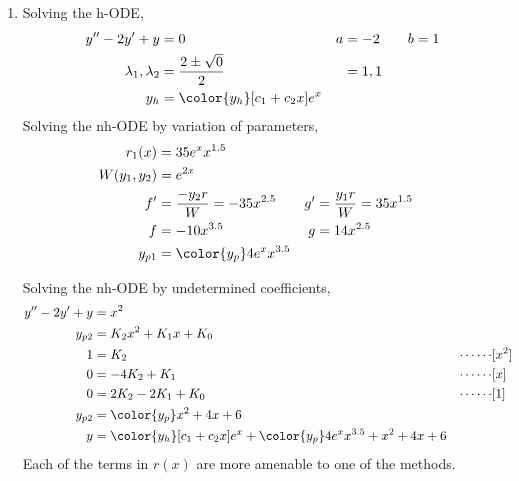 \begin{enumerate}
\begin{enumerate}
              \item Solving the h-ODE,
                    \begin{align}
                        y''  - 2y' + y           & = 0                                   & a & = -2 \qquad b = 1 \\
                        \lambda_{1}, \lambda_{2} & = \frac{2 \pm \sqrt{0}}{2}            &   & = 1, 1            \\
                        y_{h}                    & = {\color{y_h} [c_{1} + c_{2}x]e^{x}}
                    \end{align}
                    Solving the nh-ODE by variation of parameters,
                    \begin{align}
                        r_{1}(x)        & = 35e^{x}x^{1.5}                                                       \\
                        W(y_{1}, y_{2}) & = e^{2x}                                                               \\
                        f'              & = \frac{-y_{2}r}{W} = -35x^{2.5} & g' & = \frac{y_{1}r}{W} = 35x^{1.5} \\
                        f               & = -10x^{3.5}                     & g  & = 14x^{2.5}                    \\
                        y_{p1}          & = {\color{y_p} 4e^{x}x^{3.5}}
                    \end{align}

                    Solving the nh-ODE by undetermined coefficients,
                    \begin{align}
                        y'' - 2y' + y & = x^{2}                                                                                                       \\
                        y_{p2}        & = K_{2}x^{2} + K_{1}x + K_{0}                                                                                 \\
                        1             & =  K_{2}                                                                             & \cdots\cdots & [x^{2}] \\
                        0             & =  -4K_{2} + K_{1}                                                                   & \cdots\cdots & [x]     \\
                        0             & =  2K_{2}  - 2K_{1} + K_{0}                                                          & \cdots\cdots & [1]     \\
                        y_{p2}        & = {\color{y_p} x^{2} + 4x + 6}                                                                                \\
                        y             & = {\color{y_h} [c_{1} + c_{2}x]e^{x}} + {\color{y_p} 4e^{x}x^{3.5} + x^{2} + 4x + 6}
                    \end{align}
                    Each of the terms in $ r(x) $ are more amenable to one of the methods.


\end{enumerate}
\end{enumerate}

